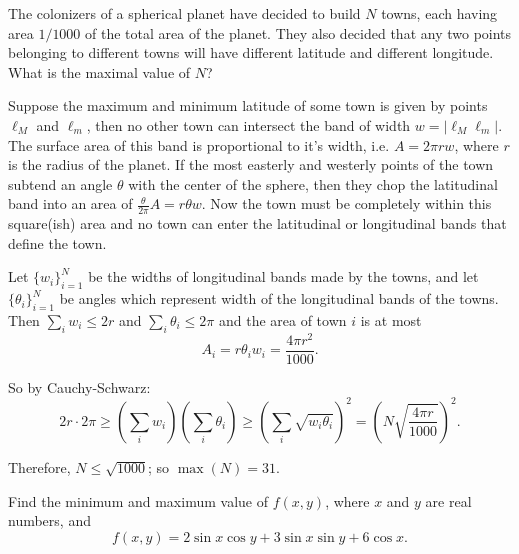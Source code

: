 \begin{question}
	The colonizers of a spherical planet have decided to build $N$ towns, each having area $1/1000$ of the total area of the planet. They also decided that any two points belonging to different towns will have different latitude and different longitude. What is the maximal value of $N$?
\end{question}





\begin{solution}[name={Solution by Ocha}] 
	Suppose the maximum and minimum latitude of some town is given by points $\ell_M$ and $\ell_m$, then no other town can intersect the band of width $w=|\ell_M\ell_m|$. The surface area of this band is proportional to it's width, i.e. $A = 2\pi r w$, where $r$ is the radius of the planet. If the most easterly and westerly points of the town subtend an angle $\theta$ with the center of the sphere, then they chop the latitudinal band into an area of $\frac{\theta}{2\pi}A = r \theta w$. Now the town must be completely within this square(ish) area and no town can enter the latitudinal or longitudinal bands that define the town.
	
	Let $\{w_i\}_{i=1}^N$ be the widths of longitudinal bands made by the towns, and let $\{\theta_i\}_{i=1}^N$ be angles which represent width of the longitudinal bands of the towns. Then $\sum_i w_i \le 2r$ and $\sum_i \theta_i \le 2\pi$ and the area of town $i$ is at most $$A_i = r \theta_i w_i = \frac{4\pi r^2}{1000}.$$
	
	So by Cauchy-Schwarz: $$2r \cdot 2 \pi \ge \left(\sum_i w_i \right)\left(\sum_i \theta_i \right) \ge \left(\sum_i\sqrt{ w_i \theta_i}\right)^2 = \left(N \sqrt{\frac{4\pi r}{1000}}\right)^2.$$
	
	Therefore, $N \le \sqrt{1000}$; so $\max(N) = 31$.
\end{solution}






\begin{question}
	Find the minimum and maximum value of $f(x,y)$, where $x$ and $y$ are real numbers, and
	\[
	f(x,y) = 2\sin{x}\cos{y} + 3\sin{x}\sin{y} + 6\cos{x}.
	\]
\end{question}





